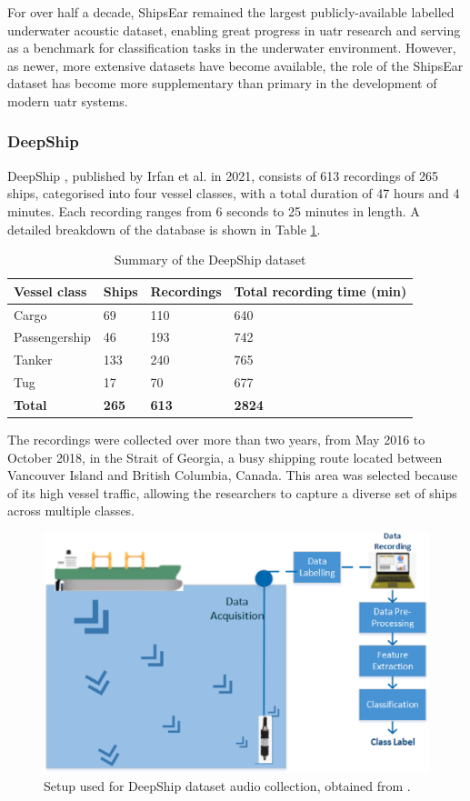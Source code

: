 For over half a decade, ShipsEar remained the largest publicly-available labelled underwater acoustic dataset, enabling great progress in \acrshort{uatr} research and serving as a benchmark for classification tasks in the underwater environment. However, as newer, more extensive datasets have become available, the role of the ShipsEar dataset has become more supplementary than primary in the development of modern \acrshort{uatr} systems.

\subsubsection{DeepShip}\label{subsubsec:deepship}

DeepShip \cite{irfan_deepship_2021}, published by Irfan et al. in 2021, consists of 613 recordings of 265 ships, categorised into four vessel classes, with a total duration of 47 hours and 4 minutes. Each recording ranges from 6 seconds to 25 minutes in length. A detailed breakdown of the database is shown in Table \ref{tab:deepship-summary}.

\begin{table}[bp]
\centering
\caption{Summary of the DeepShip dataset}
\label{tab:deepship-summary}
\begin{tabular}{llll}
\toprule
\textbf{Vessel class} & \textbf{Ships} & \textbf{Recordings} & \textbf{Total recording time (min)} \\ \midrule
Cargo           & 69  & 110   & 640 \\
Passengership   & 46  & 193   & 742 \\
Tanker          & 133 & 240   & 765 \\
Tug             & 17  & 70    & 677 \\
\textbf{Total}  & \textbf{265} & \textbf{613} & \textbf{2824} \\ \bottomrule
\end{tabular}
\end{table}

The recordings were collected over more than two years, from May 2016 to October 2018, in the Strait of Georgia, a busy shipping route located between Vancouver Island and British Columbia, Canada. This area was selected because of its high vessel traffic, allowing the researchers to capture a diverse set of ships across multiple classes.

\begin{figure}[htbp]
    \centering
    \includegraphics[width=0.6\linewidth]{img/ch2/deepship_fig_2.png}
    \caption{Setup used for DeepShip dataset audio collection, obtained from \cite[Fig. 2]{irfan_deepship_2021}.}
    \label{fig:deepship-recording-setup}
\end{figure}

